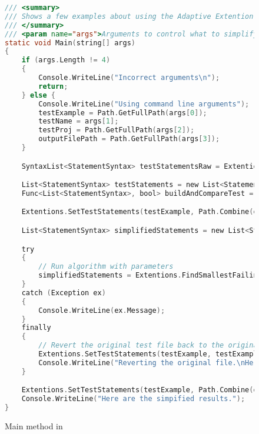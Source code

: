 \clearpage %

\label{Main Method}

\begin{figure}
\begin{lstlisting}[language=C]
/// <summary>
/// Shows a few examples about using the Adaptive Extention methods
/// </summary>
/// <param name="args">Arguments to control what to simplify; (Path to test, name of test, path to testProj, output path)</param>
static void Main(string[] args)
{
	if (args.Length != 4)
	{
		Console.WriteLine("Incorrect arguments\n");
		return;
	} else {
		Console.WriteLine("Using command line arguments");
		testExample = Path.GetFullPath(args[0]);
		testName = args[1];
		testProj = Path.GetFullPath(args[2]);
		outputFilePath = Path.GetFullPath(args[3]);
	}

	SyntaxList<StatementSyntax> testStatementsRaw = Extentions.GetTestStatements(testExample, testName);

	List<StatementSyntax> testStatements = new List<StatementSyntax>(testStatementsRaw);
	Func<List<StatementSyntax>, bool> buildAndCompareTest = BuildAndRunTest;

	Extentions.SetTestStatements(testExample, Path.Combine(outputFilePath, "Original", testName + "_" + Path.GetFileName(testExample)), testName, testStatements);

	List<StatementSyntax> simplifiedStatements = new List<StatementSyntax>();

	try
	{
		// Run algorithm with parameters
		simplifiedStatements = Extentions.FindSmallestFailingInput<StatementSyntax>(testStatements, buildAndCompareTest);
	}
	catch (Exception ex)
	{
		Console.WriteLine(ex.Message);
	}
	finally
	{
		// Revert the original test file back to the original form
		Extentions.SetTestStatements(testExample, testExample, testName, testStatements);
		Console.WriteLine("Reverting the original file.\nHere is the original file");
	}

	Extentions.SetTestStatements(testExample, Path.Combine(outputFilePath, "Simplified", testName + "_" + Path.GetFileName(testExample)), testName, simplifiedStatements);
	Console.WriteLine("Here are the simpified results.");
}
\end{lstlisting}
\caption{Main method in \mytool}
\label{fig:main1}
\end{figure}